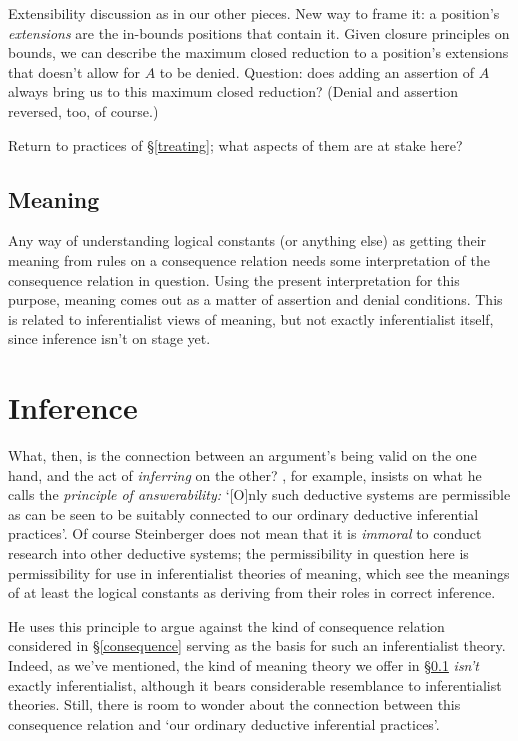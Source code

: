 \documentclass{article}
\begin{document}
Extensibility discussion as in our other pieces.
New way to frame it: a position's {\em extensions} are the in-bounds positions that contain it. 
Given closure principles on bounds, we can describe the maximum closed reduction to a position's extensions that doesn't allow for $A$ to be denied.
Question: does adding an assertion of $A$ always bring us to this maximum closed reduction?
(Denial and assertion reversed, too, of course.)

Return to practices of \S\ref{treating}; what aspects of them are at stake here?

\subsection{Meaning} \label{meaning}

Any way of understanding logical constants (or anything else) as getting their meaning from rules on a consequence relation needs some interpretation of the consequence relation in question.
Using the present interpretation for this purpose, meaning comes out as a matter of assertion and denial conditions.
This is related to inferentialist views of meaning, but not exactly inferentialist itself, since inference isn't on stage yet.


\section{Inference}

What, then, is the connection between an argument's being valid on the one hand, and the act of {\em inferring} on the other?
\cite{steinberger:wcsrs}, for example, insists on what he calls the {\em principle of answerability:} `[O]nly such deductive systems are permissible as can be seen to be suitably connected to our ordinary deductive inferential practices'.
Of course Steinberger does not mean that it is {\em immoral} to conduct research into other deductive systems; the permissibility in question here is permissibility for use in inferentialist theories of meaning, which see the meanings of at least the logical constants as deriving from their roles in correct inference.

He uses this principle to argue against the kind of consequence relation considered in \S\ref{consequence} serving as the basis for such an inferentialist theory.
Indeed, as we've mentioned, the kind of meaning theory we offer in \S\ref{meaning} {\em isn't} exactly inferentialist, although it bears considerable resemblance to inferentialist theories.
Still, there is room to wonder about the connection between this consequence relation and `our ordinary deductive inferential practices'.
\end{document}
